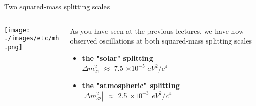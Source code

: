 \begin{frame}{Two squared-mass splitting scales}

\begin{columns}
  \begin{column}{0.50\textwidth}
    \texttt{[image: ./images/etc/mh.png]}
  \end{column}
  \begin{column}{0.50\textwidth}
    As you have seen at the previous lectures, we have now observed oscillations at both squared-mass splitting scales\\
    \vspace{0.2cm}
    \begin{itemize}
      \item {\color{red} \bf the "solar" splitting}\\
             \vspace{0.2cm}
            {\bf ${\Delta}m^{2}_{21}$ }   $\approx$ 7.5 $\times 10^{-5}$ $eV^{2}/c^{4}$\\
      \vspace{0.3cm}
      \item {\color{red} \bf the "atmospheric" splitting}\\
             \vspace{0.2cm}
            {\bf $|{\Delta}m^{2}_{32}|$ } $\approx$ 2.5 $\times 10^{-3}$ $eV^{2}/c^{4}$\\
    \end{itemize}   
  \end{column}
\end{columns}

\end{frame}

